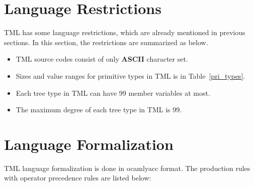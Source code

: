 \documentclass[12pt,psfig,a4]{article}
\begin{document}

\section{Language Restrictions}
TML has some language restrictions, which are already mentioned in previous sections. In this section, the restrictions are summarized as below.
\begin{itemize}
\setlength{\itemsep}{0pt}
\setlength{\parskip}{0pt}
\item TML source codes consist of only \textbf{ASCII} character set.
\item Sizes and value ranges for primitive types in TML is in Table~\ref{pri_types}.
\item Each tree type in TML can have 99 member variables at most.
\item The maximum degree of each tree type in TML is 99.
\end{itemize}

\section{Language Formalization}
TML language formalization is done in ocamlyacc format. The production rules with operator precedence rules are listed below:












\end{document}
